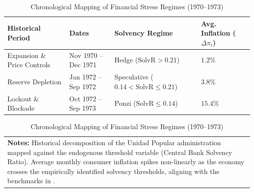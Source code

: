 \begin{table}[htbp]
\centering
\small
\caption{Chronological Mapping of Financial Stress Regimes (1970--1973)}
\label{tab:regime_chronology}
\begin{tabular}{p{3.5cm}p{3.5cm}p{3.5cm}p{3.5cm}}
\toprule
\textbf{Historical Period} & \textbf{Dates} & \textbf{Solvency Regime} & \textbf{Avg. Inflation ($\Delta \pi_t$)} \\
\midrule
Expansion \& Price Controls & Nov 1970 -- Dec 1971 & Hedge ($\text{SolvR} > 0.21$) & $1.2\%$ \\
Reserve Depletion & Jan 1972 -- Sep 1972 & Speculative ($0.14 < \text{SolvR} \le 0.21$) & $3.8\%$ \\
Lockout \& Blockade & Oct 1972 -- Sep 1973 & Ponzi ($\text{SolvR} \le 0.14$) & $15.4\%$ \\
\bottomrule
\end{tabular}
\begin{tabular}{p{}}
\footnotesize \textbf{Notes:} Historical decomposition of the Unidad Popular administration mapped against the endogenous threshold variable (Central Bank Solvency Ratio). Average monthly consumer inflation spikes non-linearly as the economy crosses the empirically identified solvency thresholds, aligning with the benchmarks in \citet{Afonso2018}.
\end{tabular}
\end{table}
